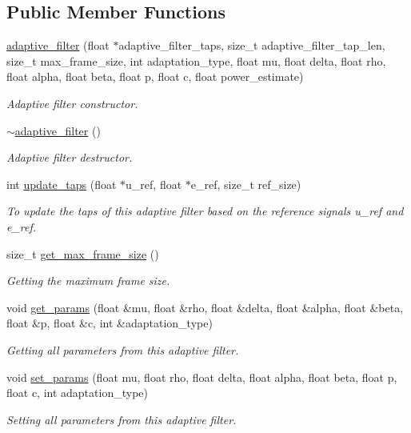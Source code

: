 \subsection*{Public Member Functions}
\begin{DoxyCompactItemize}
\item 
\hyperlink{classadaptive__filter_aacabbb2b73093c5a2e570060cff8c5c4}{adaptive\+\_\+filter} (float $\ast$adaptive\+\_\+filter\+\_\+taps, size\+\_\+t adaptive\+\_\+filter\+\_\+tap\+\_\+len, size\+\_\+t max\+\_\+frame\+\_\+size, int adaptation\+\_\+type, float mu, float delta, float rho, float alpha, float beta, float p, float c, float power\+\_\+estimate)
\begin{DoxyCompactList}\small\item\em Adaptive filter constructor. \end{DoxyCompactList}\item 
\mbox{\label{classadaptive__filter_afca230cfdf90cd16402fc44519be3018}} 
\hyperlink{classadaptive__filter_afca230cfdf90cd16402fc44519be3018}{$\sim$adaptive\+\_\+filter} ()
\begin{DoxyCompactList}\small\item\em Adaptive filter destructor. \end{DoxyCompactList}\item 
int \hyperlink{classadaptive__filter_a5185e3472d12b41debc08e1d2c255d8e}{update\+\_\+taps} (float $\ast$u\+\_\+ref, float $\ast$e\+\_\+ref, size\+\_\+t ref\+\_\+size)
\begin{DoxyCompactList}\small\item\em To update the taps of this adaptive filter based on the reference signals u\+\_\+ref and e\+\_\+ref. \end{DoxyCompactList}\item 
size\+\_\+t \hyperlink{classadaptive__filter_a281ea01967a1e95ee3182d7be68118d7}{get\+\_\+max\+\_\+frame\+\_\+size} ()
\begin{DoxyCompactList}\small\item\em Getting the maximum frame size. \end{DoxyCompactList}\item 
void \hyperlink{classadaptive__filter_a2606c675bbd630cad6db55d77ccaa759}{get\+\_\+params} (float \&mu, float \&rho, float \&delta, float \&alpha, float \&beta, float \&p, float \&c, int \&adaptation\+\_\+type)
\begin{DoxyCompactList}\small\item\em Getting all parameters from this adaptive filter. \end{DoxyCompactList}\item 
void \hyperlink{classadaptive__filter_ad6e68bd802f05a94d37bbb9a07e221f8}{set\+\_\+params} (float mu, float rho, float delta, float alpha, float beta, float p, float c, int adaptation\+\_\+type)
\begin{DoxyCompactList}\small\item\em Setting all parameters from this adaptive filter. \end{DoxyCompactList}\end{DoxyCompactItemize}
